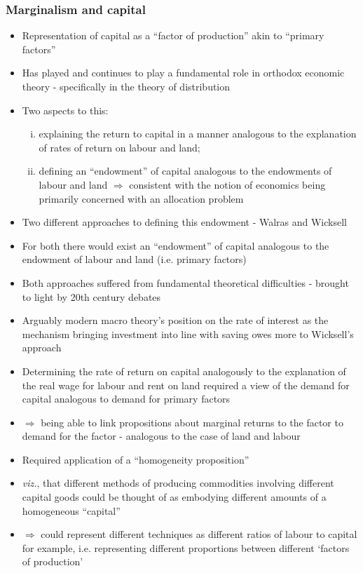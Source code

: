 \documentclass[a4paper,twoside]{article}
\numberwithin{equation}{section}
\numberwithin{figure}{section}
\begin{document}
	\subsubsection{Marginalism and capital}
	\begin{itemize}
		\item Representation of capital as a ``factor of production'' akin to ``primary factors''
		\item Has played and continues to play a fundamental role in orthodox economic theory - specifically in the theory of distribution
		\item Two aspects to this:
		\begin{enumerate}[(i)]
			\item explaining the return to capital in a manner analogous to the explanation of rates of return on labour and land;
			\item defining an ``endowment'' of capital analogous to the endowments of labour and land \( \Rightarrow \) consistent with the notion of economics being primarily concerned with an allocation problem
		\end{enumerate}
		\item Two different approaches to defining this endowment - Walras and Wicksell
		\item For both there would exist an ``endowment'' of capital analogous to the endowment of labour and land (i.e. primary factors)
		\item Both approaches suffered from fundamental theoretical difficulties - brought to light by 20th century debates
		\item Arguably modern macro theory's position on the rate of interest as the mechanism bringing investment into line with saving owes more to Wicksell's approach
		\item Determining the rate of return on capital analogously to the explanation of the real wage for labour and rent on land required a view of the demand for capital analogous to demand for primary factors
		\item \( \Rightarrow \) being able to link propositions about marginal returns to the factor to demand for the factor - analogous to the case of land and labour 
		\item Required application of a ``homogeneity proposition''
		\item  \textit{viz.}, that different methods of producing commodities involving different capital goods could be thought of as embodying different amounts of a homogeneous ``capital''
		\item \( \Rightarrow \) could represent different techniques as different ratios of labour to capital for example, i.e. representing different proportions between different `factors of production' 

\end{itemize}
\end{document}
